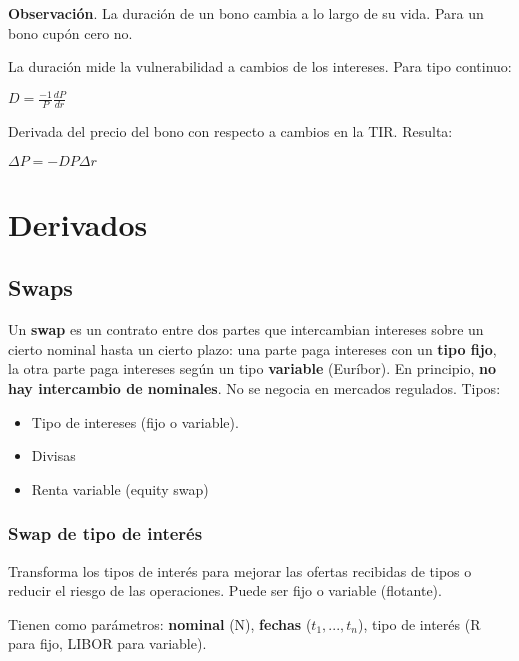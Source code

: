 \documentclass[
10pt, %
a4paper, %
oneside, %
headinclude,footinclude, %
BCOR5mm, %
]{scrartcl}
\newcommand{\n}[1]{\textbf{#1}}
\newcommand{\sub}[1]{_{#1}}
\newcommand{\f}[1]{{\large{${#1}$}}}
\newcounter{ex}
\begin{document}
			\vspace{0.3cm}

			\n{Observación}. La duración de un bono cambia a lo largo de su vida. Para un bono cupón cero no.

			La duración mide la vulnerabilidad a cambios de los intereses. Para tipo continuo:
			\begin{center} \f{D = \frac{-1}{P} \frac{dP}{dr}} \end{center}

				
				Derivada del precio del bono con respecto a cambios en la TIR. Resulta: \begin{center} \f{\Delta P = -DP\Delta r} \end{center}


	\newpage

\section{Derivados}

	\subsection{Swaps}

		Un \n{swap} es un contrato entre dos partes que intercambian intereses sobre un cierto nominal hasta un cierto plazo: una parte paga intereses con un \n{tipo fijo}, la otra parte paga intereses según un tipo \n{variable} (Euríbor). En principio, \n{no hay intercambio de nominales}.
		No se negocia en mercados regulados. Tipos:
		\begin{itemize}
			\item Tipo de intereses (fijo o variable).
			\item Divisas
			\item Renta variable (equity swap)
		\end{itemize}

		\subsubsection{Swap de tipo de interés}

			Transforma los tipos de interés para mejorar las ofertas recibidas de tipos o reducir el riesgo de las operaciones. Puede ser fijo o variable (flotante).

			Tienen como parámetros: \n{nominal} (N), \n{fechas} (\f{t\sub{1},...,t\sub{n}}), tipo de interés (R para fijo, LIBOR para variable).
\end{document}
